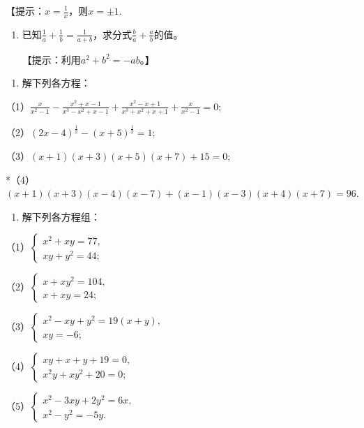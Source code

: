 【提示：\(x = \frac{1}{x}\)，则\(x = \pm 1.\)

\begin{enumerate}[start=6,label={*\arabic*.}]
\item
  已知\(\frac{1}{a} + \frac{1}{b} = \frac{1}{a + b}\)，求分式\(\frac{b}{a} + \frac{a}{b}\)的值。

【提示：利用\(a^2 + b^2 = -ab\)。】

\end{enumerate}
\begin{enumerate}[start=7]
\item
  解下列各方程：
\end{enumerate}

（1）\(\frac{x}{x^2 - 1} - \frac{x^2 + x - 1}{x^3 - x^2 + x - 1} + \frac{x^2 - x + 1}{x^3 + x^2 + x + 1} + \frac{x}{x^2 - 1} = 0;\)

（2）\((2x - 4)^{\frac{1}{2}} - (x + 5)^{\frac{1}{2}} = 1;\)

（3）\((x + 1)(x + 3)(x + 5)(x + 7) + 15 = 0;\)

*（4）\((x + 1)(x + 3)(x - 4)(x - 7) + (x - 1)(x - 3)(x + 4)(x + 7) = 96.\)

\begin{enumerate}[start=8]
\item
  解下列各方程组：
\end{enumerate}

（1）\(\left\{ \begin{array}{l} x^{2} + xy = 77, \\ xy + y^{2} = 44; \end{array} \right.\)

（2）\(\left\{ \begin{array}{l} x + xy^2 = 104, \\ x + xy = 24; \end{array} \right.\)

（3）\(\left\{ \begin{array}{l} x^{2} - xy + y^{2} = 19(x + y), \\ xy = -6; \end{array} \right.\)

（4）\(\left\{ \begin{array}{l} xy + x + y + 19 = 0, \\ x^2y + xy^2 + 20 = 0; \end{array} \right.\)

（5）\(\left\{ \begin{array}{l} x^{2} - 3xy + 2y^{2} = 6x, \\ x^{2} - y^{2} = -5y. \end{array} \right.\)

